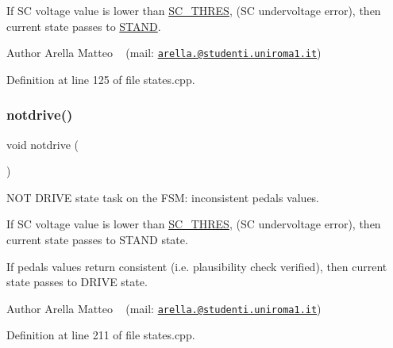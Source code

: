 If SC voltage value is lower than \mbox{\hyperlink{group__stages__group_ga9688af4f17ae88b4d149269d71b7ff1f}{S\+C\+\_\+\+T\+H\+R\+ES}}, (SC undervoltage error), then current state passes to \mbox{\hyperlink{_f_s_m_page_STAND}{S\+T\+A\+ND}}.

\begin{DoxyAuthor}{Author}
Arella Matteo ~\newline
 (mail\+: \href{mailto:arella.1646983@studenti.uniroma1.it}{\tt arella.@studenti.\+uniroma1.\+it}) 
\end{DoxyAuthor}


Definition at line 125 of file states.\+cpp.

\mbox{\label{group__stages__group_ga3ac5d1576c7d3ef76c2dfe724d4849fa}} 
\subsubsection{\texorpdfstring{notdrive()}{notdrive()}}
{\footnotesize\ttfamily void notdrive (\begin{DoxyParamCaption}{ }\end{DoxyParamCaption})}



N\+OT D\+R\+I\+VE state task on the F\+SM\+: inconsistent pedals values. 

If SC voltage value is lower than \mbox{\hyperlink{group__stages__group_ga9688af4f17ae88b4d149269d71b7ff1f}{S\+C\+\_\+\+T\+H\+R\+ES}}, (SC undervoltage error), then current state passes to S\+T\+A\+ND state.

If pedals values return consistent (i.\+e. plausibility check verified), then current state passes to D\+R\+I\+VE state.

\begin{DoxyAuthor}{Author}
Arella Matteo ~\newline
 (mail\+: \href{mailto:arella.1646983@studenti.uniroma1.it}{\tt arella.@studenti.\+uniroma1.\+it}) 
\end{DoxyAuthor}


Definition at line 211 of file states.\+cpp.

\mbox{\label{group__stages__group_ga47cb7615bbcf2c96cc4a7656f9a76bab}} 
